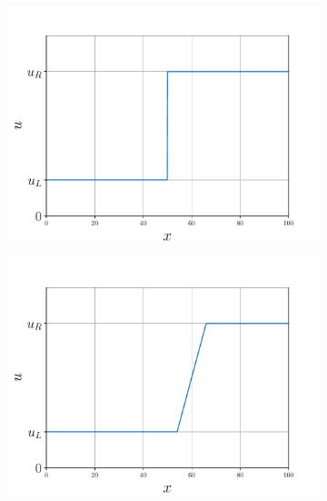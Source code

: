 \begin{figure}[ht]
	\begin{subfigure}{0.5\textwidth}
		\centering
		\includegraphics[width=\linewidth]{../some_plots/cap1/graficas/riemannRL-0.pdf}
	\end{subfigure}
	\begin{subfigure}{0.5\textwidth}
		\centering
		\includegraphics[width=\linewidth]{../some_plots/cap1/graficas/riemannRL-0.4.pdf}
	\end{subfigure}
	\begin{subfigure}{0.5\textwidth}
		\centering

\end{subfigure}
\end{figure}

